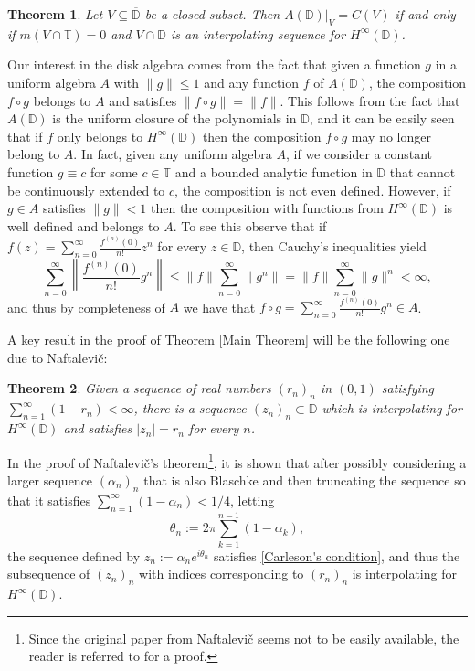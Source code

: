 \documentclass[preprint,12pt,number]{elsarticle}
\newtheorem{theorem}{Theorem}[section]
\newcommand{\D}{\mathbb{D}}
\newcommand{\T}{\mathbb{T}}
\begin{document}

\begin{theorem}\label{Beurling-Rudin}
    Let $V\subseteq \overline{\D}$ be a closed subset. Then $A(\D)|_V=C(V)$ if and only if $m(V\cap \T)=0$ and $V\cap \D$ is an interpolating sequence for $H^\infty(\D)$.
\end{theorem}

Our interest in the disk algebra comes from the fact that given a function $g$ in a uniform algebra $A$ with $\lVert g \rVert\leq 1$ and any function $f$ of $A(\D)$, the composition $f\circ g$ belongs to $A$ and satisfies $\lVert f\circ g \rVert=\lVert f \rVert$. This follows from the fact that $A(\D)$ is the uniform closure of the polynomials in $\D$, and it can be easily seen that if $f$ only belongs to $H^\infty(\D)$ then the composition $f\circ g$ may no longer belong to $A$. In fact, given any uniform algebra $A$, if we consider a constant function $g\equiv c$ for some $c\in \T$ and a bounded analytic function in $\D$ that cannot be continuously extended to $c$, the composition is not even defined. However, if $g\in A$ satisfies $\lVert g \rVert<1$ then the composition with functions from $H^\infty(\D)$ is well defined and belongs to $A$. To see this observe that if $f(z)=\sum_{n=0}^\infty\frac{f^{(n)}(0)}{n!}z^n$ for every $z\in\D$, then Cauchy's inequalities yield 
\[
\sum_{n=0}^\infty \left\lVert \frac{f^{(n)}(0)}{n!}g^n \right\rVert \leq \lVert f \rVert\sum_{n=0}^\infty \lVert g^n \rVert=\lVert f \rVert\sum_{n=0}^\infty \lVert g \rVert^n<\infty,
\] 
and thus by completeness of $A$ we have that $f\circ g=\sum_{n=0}^\infty \frac{f^{(n)}(0)}{n!}g^n\in A$. 

A key result in the proof of Theorem \ref{Main Theorem} will be the following one due to Naftalevi\v{c}: 

\begin{theorem}
    Given a sequence of real numbers $(r_n)_n$ in $(0,1)$ satisfying $\sum_{n=1}^\infty(1-r_n)<\infty$, there is a sequence $(z_n)_n\subset \D$ which is interpolating for $H^\infty(\D)$ and satisfies $|z_n|=r_n$ for every $n$.
\end{theorem}

In the proof of Naftalevi\v{c}'s theorem\footnote{Since the original paper from Naftalevi\v{c} seems not to be easily available, the reader is referred to \cite{Cochran1990} for a proof.}, it is shown that after possibly considering a larger sequence $(\alpha_n)_n$ that is also Blaschke and then truncating the sequence so that it satisfies $\sum_{n=1}^\infty(1-\alpha_n)<1/4$, letting 
\[
\theta_n:=2\pi\sum_{k=1}^{n-1}(1-\alpha_k),
\]
the sequence defined by $z_n:=\alpha_ne^{i\theta_n}$ satisfies \eqref{Carleson's condition}, and thus the subsequence of $(z_n)_n$ with indices corresponding to $(r_n)_n$ is interpolating for $H^\infty(\D)$. 
\end{document}
